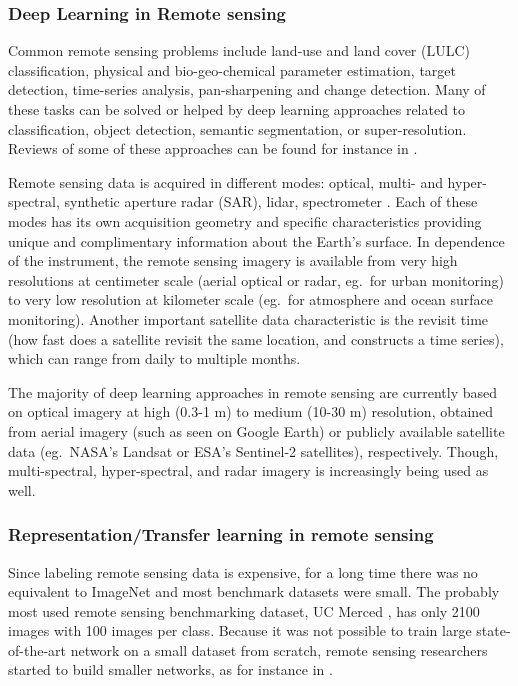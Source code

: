 \subsubsection*{Deep Learning in Remote sensing}
Common remote sensing problems include land-use and land cover (LULC) classification, physical and bio-geo-chemical parameter estimation, target detection, time-series analysis, pan-sharpening and change detection. Many of these tasks can be solved or helped by deep learning approaches related to classification, object detection, semantic segmentation, or super-resolution. Reviews of some of these approaches can be found for instance in \citep{ball2017:dl-rs-review, zhu2017:dl_rs_review, zhu2019:dl-rs}. 

Remote sensing data is acquired in different modes: optical, multi- and hyper-spectral, synthetic aperture radar (SAR), lidar, spectrometer \citep{elachi2006:rs-introduction}. Each of these modes has its own acquisition geometry and specific characteristics providing unique and complimentary information about the Earth's surface. In dependence of the instrument, the remote sensing imagery is available from very high resolutions at centimeter scale (aerial optical or radar, eg.\ for urban monitoring) to very low resolution at kilometer scale (eg.\ for atmosphere and ocean surface monitoring). Another important satellite data characteristic is the revisit time (how fast does a satellite revisit the same location, and constructs a time series), which can range from daily to multiple months.

The majority of deep learning approaches in remote sensing are currently based on optical imagery at high (0.3-1 m) to medium (10-30 m) resolution, obtained from aerial imagery (such as seen on Google Earth) or publicly available satellite data (eg.\ NASA's Landsat or ESA's Sentinel-2 satellites), respectively. Though, multi-spectral, hyper-spectral, and radar imagery is increasingly being used as well.



\subsubsection*{Representation/Transfer learning in remote sensing}
Since labeling remote sensing data is expensive, for a long time there was no equivalent to ImageNet and most benchmark datasets were small. The probably most used remote sensing benchmarking dataset, UC Merced \citep{yang2010:ucmerced}, has only 2100 images with 100 images per class. 
Because it was not possible to train large state-of-the-art network on a small dataset from scratch, remote sensing researchers started to build smaller networks, as for instance in \cite{luus2015:cnn-multiview}.



